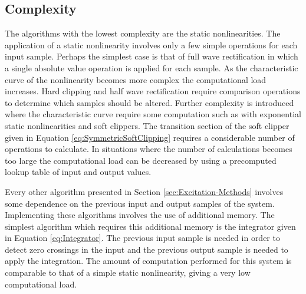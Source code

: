 	\subsection{Complexity}
	\label{sec:ExcitationEvaluation-Comparison-Complexity}
		The algorithms with the lowest complexity are the static nonlinearities. The application of a static
		nonlinearity involves only a few simple operations for each input sample. Perhaps the simplest case is that
		of full wave rectification in which a single absolute value operation is applied for each sample. As the
		characteristic curve of the nonlinearity becomes more complex the computational load increases. Hard
		clipping and half wave rectification require comparison operations to determine which samples should be
		altered. Further complexity is introduced where the characteristic curve require some computation such as
		with exponential static nonlinearities and soft clippers. The transition section of the soft clipper given
		in Equation \ref{eq:SymmetricSoftClipping} requires a considerable number of operations to calculate. In
		situations where the number of calculations becomes too large the computational load can be decreased by
		using a precomputed lookup table of input and output values.

		Every other algorithm presented in Section \ref{sec:Excitation-Methods} involves some dependence on the
		previous input and output samples of the system. Implementing these algorithms involves the use of
		additional memory. The simplest algorithm which requires this additional memory is the integrator given in
		Equation \ref{eq:Integrator}. The previous input sample is needed in order to detect zero crossings in the
		input and the previous output sample is needed to apply the integration. The amount of computation
		performed for this system is comparable to that of a simple static nonlinearity, giving a very low
		computational load.

